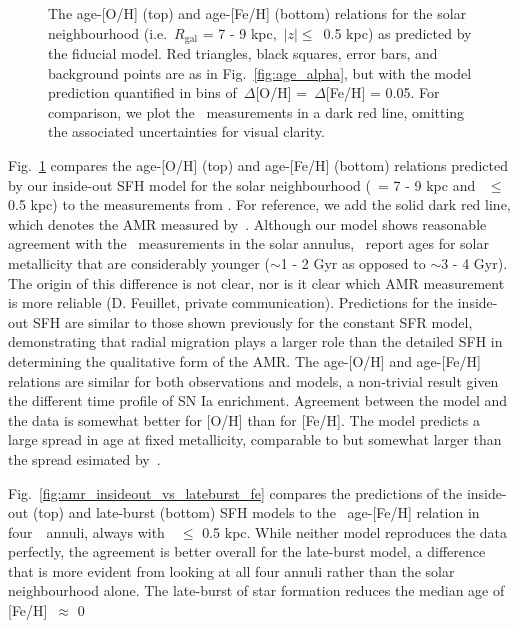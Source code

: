\documentclass[draft2.tex]{subfiles}
\begin{document}
\begin{figure}
\caption{The age-[O/H] (top) and age-[Fe/H] (bottom) relations for the solar 
neighbourhood (i.e.~$R_\text{gal}$ = 7 - 9 kpc,~$\left|z\right|\leq$~0.5 kpc) 
as predicted by the fiducial model. Red triangles, black squares, error bars, 
and background points are as in Fig.~\ref{fig:age_alpha}, but with the model 
prediction quantified in bins of~$\Delta$[O/H] =~$\Delta$[Fe/H] = 0.05. For 
comparison, we plot the~\citet{Feuillet2018} measurements in a dark red line, 
omitting the associated uncertainties for visual clarity. } 
\label{fig:amr_solar_annulus} 
\end{figure} 

Fig.~\ref{fig:amr_solar_annulus} compares the age-[O/H] (top) and 
age-[Fe/H] (bottom) relations predicted by our inside-out SFH model for the 
solar neighbourhood (\rgal~= 7 - 9 kpc and \absz~$\leq$ 0.5 kpc) to the 
measurements from \citet{Feuillet2019}. 
For reference, we add the solid dark red line, which denotes the AMR measured 
by~\citet{Feuillet2018}. 
Although our model shows reasonable agreement with the~\citet{Feuillet2019} 
measurements in the solar annulus,~\citet{Feuillet2018} report ages for solar 
metallicity that are considerably younger ($\sim$1 - 2 Gyr as opposed to 
$\sim$3 - 4 Gyr). 
The origin of this difference is not clear, nor is it clear which AMR 
measurement is more reliable (D. Feuillet, private communication). 
Predictions for the inside-out SFH are similar to those shown previously 
for the constant SFR model, demonstrating that radial migration plays a larger 
role than the detailed SFH in determining the qualitative form of the AMR. 
The age-[O/H] and age-[Fe/H] relations are similar for both observations and 
models, a non-trivial result given the different time profile of SN Ia 
enrichment. 
Agreement between the model and the data is somewhat better for [O/H] than for 
[Fe/H]. 
The model predicts a large spread in age at fixed metallicity, comparable to 
but somewhat larger than the spread esimated by~\citet{Feuillet2019}. 
\par
Fig.~\ref{fig:amr_insideout_vs_lateburst_fe} compares the predictions of the 
inside-out (top) and late-burst (bottom) SFH models to the~\citet{Feuillet2019} 
age-[Fe/H] relation in four~\rgal~annuli, always with~\absz~$\leq$ 0.5 kpc. 
While neither model reproduces the data perfectly, the agreement is better 
overall for the late-burst model, a difference that is more evident from 
looking at all four annuli rather than the solar neighbourhood alone. 
The late-burst of star formation reduces the median age of [Fe/H]~$\approx$ 0 
\end{document}

